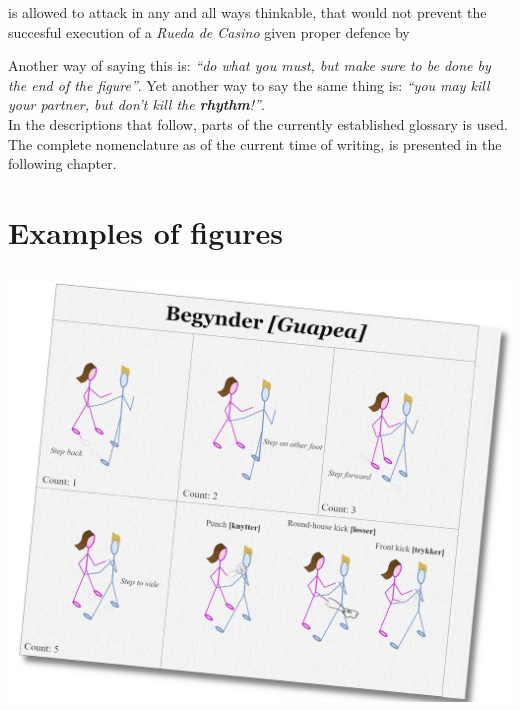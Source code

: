\begin{definition}
\gal is allowed to attack \dude in any and all ways thinkable, that would not prevent the succesful execution of a \textit{Rueda de Casino} given proper defence by \dude
\end{definition}

Another way of saying this is: \textit{``do what you must, but make sure to be done by the end of the figure''}. Yet another way to say the same thing is: \textit{``you may kill your partner, but don't kill the \textbf{rhythm}!''}.\\
In the descriptions that follow, parts of the currently established \sovs glossary is used. The complete \sovs nomenclature as of the current time of writing, is presented in the following chapter. 

\pagebreak{}
\section*{Examples of figures}
\subsection*{\Sovsguapea [\Salsaguapea]}
\begin{center}
\includegraphics[scale=0.15]{02-Description/diagram-guapea-present}
\end{center}


